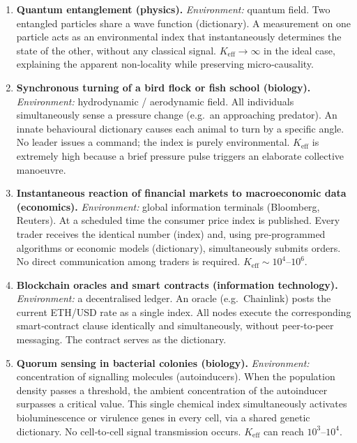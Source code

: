\documentclass[11pt,a4paper]{article}
\begin{document}
	\begin{enumerate}[leftmargin=*]
		\item \textbf{Quantum entanglement (physics).}
		\textit{Environment:} quantum field. Two entangled particles share a wave function (dictionary).
		A measurement on one particle acts as an environmental index that instantaneously determines
		the state of the other, without any classical signal. $K_{\mathrm{eff}}\to\infty$ in the ideal case,
		explaining the apparent non‑locality while preserving micro‑causality.
		
		\item \textbf{Synchronous turning of a bird flock or fish school (biology).}
		\textit{Environment:} hydrodynamic / aerodynamic field. All individuals simultaneously sense
		a pressure change (e.g.\ an approaching predator). An innate behavioural dictionary causes each
		animal to turn by a specific angle. No leader issues a command; the index is purely environmental.
		$K_{\mathrm{eff}}$ is extremely high because a brief pressure pulse triggers an elaborate
		collective manoeuvre.
		
		\item \textbf{Instantaneous reaction of financial markets to macroeconomic data (economics).}
		\textit{Environment:} global information terminals (Bloomberg, Reuters). At a scheduled time the
		consumer price index is published. Every trader receives the identical number (index) and, using
		pre‑programmed algorithms or economic models (dictionary), simultaneously submits orders. No
		direct communication among traders is required. $K_{\mathrm{eff}}\sim 10^{4}$--$10^{6}$.
		
		\item \textbf{Blockchain oracles and smart contracts (information technology).}
		\textit{Environment:} a decentralised ledger. An oracle (e.g.\ Chainlink) posts the current
		ETH/USD rate as a single index. All nodes execute the corresponding smart‑contract clause
		identically and simultaneously, without peer‑to‑peer messaging. The contract serves as the
		dictionary.
		
		\item \textbf{Quorum sensing in bacterial colonies (biology).}
		\textit{Environment:} concentration of signalling molecules (autoinducers). When the population
		density passes a threshold, the ambient concentration of the autoinducer surpasses a critical
		value. This single chemical index simultaneously activates bioluminescence or virulence genes in
		every cell, via a shared genetic dictionary. No cell‑to‑cell signal transmission occurs.
		$K_{\mathrm{eff}}$ can reach $10^{3}$--$10^{4}$.
	\end{enumerate}
	
\end{document}
